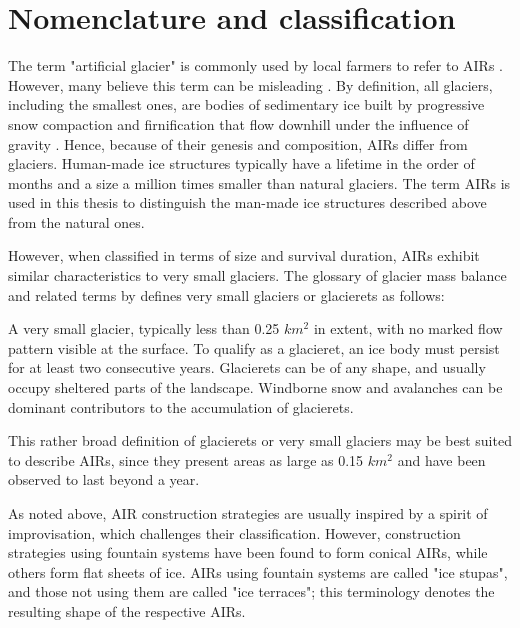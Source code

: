 \section{Nomenclature and classification}

The term "artificial glacier" is commonly used by local farmers to refer to \ac{AIRs}
\citep{norphelArtificialGlacierHigh2009}. However, many believe this term can be misleading
\citep{nusserSociohydrologyArtificialGlaciers2019}. By definition, all glaciers, including the smallest ones,
are bodies of sedimentary ice built by progressive snow compaction and firnification that flow downhill under
the influence of gravity \citep{benndouglasGlaciersGlaciation2014}. Hence, because of their genesis and
composition, \ac{AIRs} differ from glaciers. Human-made ice structures typically have a lifetime in the order of
months and a size a million times smaller than natural glaciers. The term \ac{AIRs} is used in this thesis to
distinguish the man-made ice structures described above from the natural ones.

However, when classified in terms of size and survival duration, \ac{AIRs} exhibit similar characteristics to
very small glaciers. The glossary of glacier mass balance and related terms by
\citet{cogleyGlossaryGlacierMass2010} defines very small glaciers or glacierets as follows:

\begin{thesis_quotation}
	A very small glacier, typically less than 0.25 $km^2$ in extent, with no marked flow pattern
	visible at the surface. To qualify as a glacieret, an ice body must persist for at least two consecutive
	years. Glacierets can be of any shape, and usually occupy sheltered parts of the landscape. Windborne snow and
	avalanches can be dominant contributors to the accumulation of glacierets.
\end{thesis_quotation}

This rather broad definition of glacierets or very small glaciers may be best suited to describe \ac{AIRs}, since
they present areas as large as 0.15 $km^2$ \citep{nusserSociohydrologyArtificialGlaciers2019} and
have been observed to last beyond a year.

As noted above, \ac{AIR} construction strategies are usually inspired by a spirit of improvisation, which challenges
their classification. However, construction strategies using fountain systems have been found to form
conical \ac{AIRs}, while others form flat sheets of ice. \ac{AIRs} using fountain systems are called
"ice stupas", and those not using them are called "ice terraces"; this terminology denotes the resulting shape of the
respective \ac{AIRs}.

